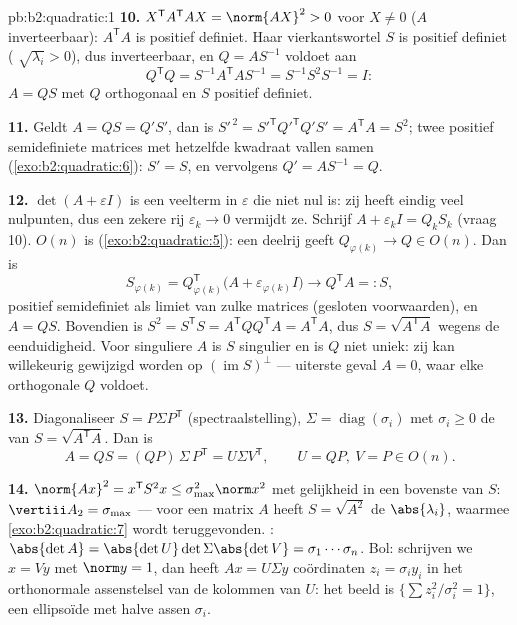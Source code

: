 \begin{solution}{pb:b2:quadratic:1}
\textbf{10.} $X^{\mathsf T}A^{\mathsf T}AX = \norm{AX}^2 > 0$ voor
$X \neq 0$ ($A$ inverteerbaar): $A^{\mathsf T}A$ is positief
definiet. Haar vierkantswortel $S$ is positief definiet
( $\sqrt{\lambda_i} > 0$), dus inverteerbaar, en $Q =
AS^{-1}$ voldoet aan
\[
Q^{\mathsf T}Q = S^{-1}A^{\mathsf T}AS^{-1}
= S^{-1}S^2S^{-1} = I :
\]
$A = QS$ met $Q$ orthogonaal en $S$ positief definiet.

\textbf{11.} Geldt $A = QS = Q'S'$, dan is $S'^{\,2} =
S'^{\mathsf T}Q'^{\mathsf T}Q'S' = A^{\mathsf T}A = S^2$; twee
positief semidefiniete matrices met hetzelfde kwadraat vallen samen
(\cref{exo:b2:quadratic:6}): $S' = S$, en vervolgens $Q' = AS^{-1}
= Q$.

\textbf{12.} $\det(A + \varepsilon I)$ is een veelterm in
$\varepsilon$ die niet nul is: zij heeft eindig veel nulpunten, dus
een zekere rij $\varepsilon_k \to 0$ vermijdt ze. Schrijf $A +
\varepsilon_kI = Q_kS_k$ (vraag 10). $O(n)$ is 
(\cref{exo:b2:quadratic:5}): een deelrij geeft $Q_{\varphi(k)}
\to Q \in O(n)$. Dan is
\[
S_{\varphi(k)} = Q_{\varphi(k)}^{\mathsf T}
\bigl(A + \varepsilon_{\varphi(k)}I\bigr)
\longrightarrow Q^{\mathsf T}A =: S,
\]
 positief semidefiniet als limiet van zulke matrices
(gesloten voorwaarden), en $A = QS$. Bovendien is $S^2 = S^{\mathsf
T}S = A^{\mathsf T}QQ^{\mathsf T}A = A^{\mathsf T}A$, dus $S =
\sqrt{A^{\mathsf T}A}$ wegens de eenduidigheid. Voor singuliere $A$
is $S$ singulier en is $Q$ niet uniek: zij kan willekeurig gewijzigd
worden op $(\operatorname{im} S)^{\perp}$ --- uiterste geval $A =
0$, waar elke orthogonale $Q$ voldoet.

\textbf{13.} Diagonaliseer $S = P\Sigma P^{\mathsf T}$
(spectraalstelling), $\Sigma = \operatorname{diag}(\sigma_i)$ met
$\sigma_i \geq 0$ de  van $S = \sqrt{A^{\mathsf T}A}$.
Dan is
\[
A = QS = (QP)\,\Sigma\,P^{\mathsf T} = U\Sigma V^{\mathsf T},
\qquad U = QP,\ V = P \in O(n) .
\]

\textbf{14.} $\norm{Ax}^2 = x^{\mathsf T}S^2x \leq
\sigma_{\max}^2\norm x^2$ met gelijkheid in een bovenste
 van $S$: $\vertiii A_2 = \sigma_{\max}$ --- voor een
 matrix $A$ heeft $S = \sqrt{A^2}$ de
 $\abs{\lambda_i}$, waarmee \cref{exo:b2:quadratic:7} wordt
teruggevonden. : $\abs{\det A} =
\abs{\det U}\det\Sigma\abs{\det V} = \sigma_1\cdots\sigma_n$.
Bol: schrijven we $x = Vy$ met $\norm y = 1$, dan heeft $Ax =
U\Sigma y$ coördinaten $z_i = \sigma_iy_i$ in het orthonormale
assenstelsel van de kolommen van $U$: het beeld is $\{\sum
z_i^2/\sigma_i^2 = 1\}$, een ellipsoïde met halve assen
$\sigma_i$.


\end{solution}
